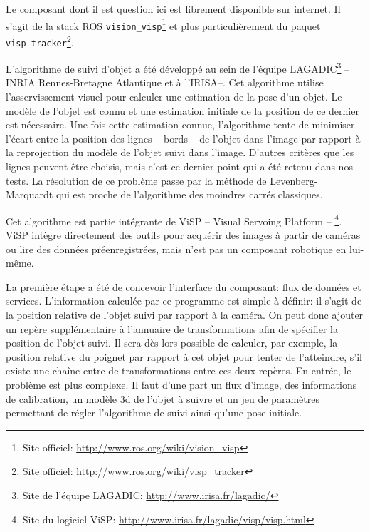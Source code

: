 Le composant dont il est question ici est librement disponible sur
internet. Il s'agit de la stack ROS
\texttt{vision\_visp}\footnote{Site officiel:
  \url{http://www.ros.org/wiki/vision_visp}} et plus particulièrement
du paquet \texttt{visp\_tracker}\footnote{Site officiel:
  \url{http://www.ros.org/wiki/visp_tracker}}.


L'algorithme de suivi d'objet a été développé au sein de l'équipe
LAGADIC\footnote{Site de l'équipe LAGADIC:
  \url{http://www.irisa.fr/lagadic/}} -- INRIA Rennes-Bretagne
Atlantique et à l'IRISA--. Cet algorithme utilise l'asservissement
visuel pour calculer une estimation de la pose d'un objet. Le modèle
de l'objet est connu et une estimation initiale de la position de ce
dernier est nécessaire. Une fois cette estimation connue, l'algorithme
tente de minimiser l'écart entre la position des lignes -- bords -- de
l'objet dans l'image par rapport à la reprojection du modèle de
l'objet suivi dans l'image. D'autres critères que les lignes peuvent
être choisis, mais c'est ce dernier point qui a été retenu dans nos
tests. La résolution de ce problème passe par la méthode de
Levenberg-Marquardt qui est proche de
l'algorithme des moindres carrés classiques.


Cet algorithme est partie intégrante de ViSP -- Visual Servoing
Platform -- \footnote{Site du logiciel ViSP:
  \url{http://www.irisa.fr/lagadic/visp/visp.html}}. ViSP intègre
directement des outils pour acquérir des images à partir de caméras ou
lire des données préenregistrées, mais n'est pas un composant
robotique en lui-même.


La première étape a été de concevoir l'interface du composant: flux de données
et services. L'information calculée par ce programme est simple à
définir: il s'agit de la position relative de l'objet suivi par
rapport à la caméra. On peut donc ajouter un repère supplémentaire à
l'annuaire de transformations afin de spécifier la position de l'objet
suivi. Il sera dès lors possible de calculer, par exemple, la position
relative du poignet par rapport à cet objet pour tenter de
l'atteindre, s'il existe une chaîne entre de transformations entre ces
deux repères. En entrée, le problème est plus complexe. Il faut d'une
part un flux d'image, des informations de calibration, un modèle 3d de
l'objet à suivre et un jeu de paramètres permettant de régler
l'algorithme de suivi ainsi qu'une pose initiale.

